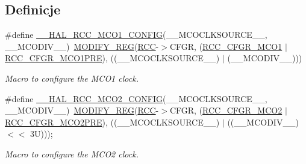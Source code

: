 \subsection*{Definicje}
\begin{DoxyCompactItemize}
\item 
\#define \hyperlink{group___r_c_c_ex___m_c_ox___clock___config_ga7e5f7f1efc92794b6f0e96068240b45e}{\+\_\+\+\_\+\+H\+A\+L\+\_\+\+R\+C\+C\+\_\+\+M\+C\+O1\+\_\+\+C\+O\+N\+F\+IG}(\+\_\+\+\_\+\+M\+C\+O\+C\+L\+K\+S\+O\+U\+R\+C\+E\+\_\+\+\_\+,  \+\_\+\+\_\+\+M\+C\+O\+D\+I\+V\+\_\+\+\_\+)~\hyperlink{group___exported__macro_ga6553c99f510c3bab8cc0a91602053247}{M\+O\+D\+I\+F\+Y\+\_\+\+R\+EG}(\hyperlink{group___peripheral__declaration_ga74944438a086975793d26ae48d5882d4}{R\+CC}-\/$>$C\+F\+GR, (\hyperlink{group___peripheral___registers___bits___definition_ga26eb4a66eeff0ba17e9d2a06cf937ca4}{R\+C\+C\+\_\+\+C\+F\+G\+R\+\_\+\+M\+C\+O1} $\vert$ \hyperlink{group___peripheral___registers___bits___definition_ga23171ca70972a106109a6e0804385ec5}{R\+C\+C\+\_\+\+C\+F\+G\+R\+\_\+\+M\+C\+O1\+P\+RE}), ((\+\_\+\+\_\+\+M\+C\+O\+C\+L\+K\+S\+O\+U\+R\+C\+E\+\_\+\+\_\+) $\vert$ (\+\_\+\+\_\+\+M\+C\+O\+D\+I\+V\+\_\+\+\_\+)))
\begin{DoxyCompactList}\small\item\em Macro to configure the M\+C\+O1 clock. \end{DoxyCompactList}\item 
\#define \hyperlink{group___r_c_c_ex___m_c_ox___clock___config_gabb7360422910dd65312786fc49722d25}{\+\_\+\+\_\+\+H\+A\+L\+\_\+\+R\+C\+C\+\_\+\+M\+C\+O2\+\_\+\+C\+O\+N\+F\+IG}(\+\_\+\+\_\+\+M\+C\+O\+C\+L\+K\+S\+O\+U\+R\+C\+E\+\_\+\+\_\+,  \+\_\+\+\_\+\+M\+C\+O\+D\+I\+V\+\_\+\+\_\+)~\hyperlink{group___exported__macro_ga6553c99f510c3bab8cc0a91602053247}{M\+O\+D\+I\+F\+Y\+\_\+\+R\+EG}(\hyperlink{group___peripheral__declaration_ga74944438a086975793d26ae48d5882d4}{R\+CC}-\/$>$C\+F\+GR, (\hyperlink{group___peripheral___registers___bits___definition_ga022248a1167714f4d847b89243dc5244}{R\+C\+C\+\_\+\+C\+F\+G\+R\+\_\+\+M\+C\+O2} $\vert$ \hyperlink{group___peripheral___registers___bits___definition_gae387252f29b6f98cc1fffc4fa0719b6e}{R\+C\+C\+\_\+\+C\+F\+G\+R\+\_\+\+M\+C\+O2\+P\+RE}), ((\+\_\+\+\_\+\+M\+C\+O\+C\+L\+K\+S\+O\+U\+R\+C\+E\+\_\+\+\_\+) $\vert$ ((\+\_\+\+\_\+\+M\+C\+O\+D\+I\+V\+\_\+\+\_\+) $<$$<$ 3\+U)));
\begin{DoxyCompactList}\small\item\em Macro to configure the M\+C\+O2 clock. \end{DoxyCompactList}\end{DoxyCompactItemize}


